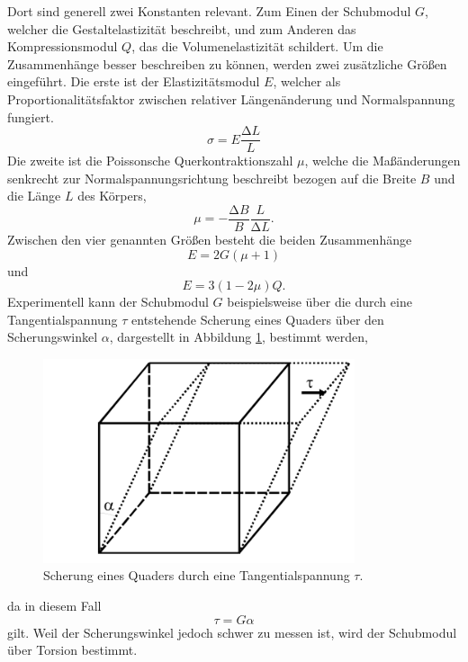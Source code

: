 Dort sind generell zwei Konstanten relevant.
Zum Einen der Schubmodul $G$, welcher die Gestaltelastizität beschreibt, und zum Anderen das Kompressionsmodul $Q$, das die Volumenelastizität schildert.
Um die Zusammenhänge besser beschreiben zu können, werden zwei zusätzliche Größen eingeführt.
Die erste ist der Elastizitätsmodul $E$, welcher als Proportionalitätsfaktor zwischen relativer Längenänderung und Normalspannung fungiert.
\begin{equation}
  \sigma = E \frac{\increment L}{L}
\end{equation}
Die zweite ist die Poissonsche Querkontraktionszahl $\mu$, welche die Maßänderungen senkrecht zur Normalspannungsrichtung beschreibt bezogen auf die Breite $B$ und die Länge $L$ des Körpers,
\begin{equation}
  \mu = - \frac{\increment B}{B} \frac{L}{\increment L}.
\end{equation}
Zwischen den vier genannten Größen besteht die beiden Zusammenhänge
\begin{equation}
  E = 2G(\mu+1) \label{eqn:1}
\end{equation}
und
\begin{equation}
  E = 3(1-2\mu)Q. \label{eqn:2}    %
\end{equation}
Experimentell kann der Schubmodul $G$ beispielsweise über die durch eine Tangentialspannung $\tau$ entstehende Scherung eines Quaders über den Scherungswinkel $\alpha$, dargestellt in Abbildung \ref{fig:1}, bestimmt werden,
\begin{figure}[H]
  \centering
  \includegraphics[height=6cm]{scherung1.png}
  \caption{Scherung eines Quaders durch eine Tangentialspannung $\tau$. \cite{sample}}
  \label{fig:1}
\end{figure}
da in diesem Fall
\begin{equation}
  \tau = G \alpha \label{eqn:3}
\end{equation}
gilt.
Weil der Scherungswinkel jedoch schwer zu messen ist, wird der Schubmodul über Torsion bestimmt.
